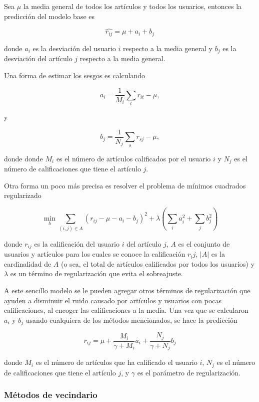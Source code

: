 Sea $\mu$ la media general de todos los artículos y todos los usuarios, entonces la predicción del modelo base es

\[
\hat{r_{ij}} = \mu + a_i + b_j
\]

donde $a_i$ es la desviación del usuario $i$ respecto a la media general y $b_j$ es la desviación del artículo $j$ respecto a la media general.

Una forma de estimar los sesgos es calculando

\[
a_i = \frac{1}{M_i} \sum_t r_{it} - \mu,
\]

y 

\[
b_j = \frac{1}{N_j} \sum_s r_{sj} - \mu,
\]

donde donde $M_i$ es el número de artículos calificados por el usuario $i$ y $N_j$ es el número de calificaciones que tiene el artículo $j$.

Otra forma un poco más precisa es resolver el problema de mínimos cuadrados regularizado

\[
\min_{b} \sum_{(i, j) \in A} \left( r_{ij} - \mu - a_i - b_j \right) ^2 + \lambda \left( \sum_{i} a_i^2 + \sum_{j} b_j^2 \right)
\]

donde $r_{ij}$ es la calificación del usuario $i$ del artículo $j$, $A$ es el conjunto de usuarios y artículos para los cuales se conoce la calificación $r_ij$, $ \vert A \vert$ es la cardinalidad de $A$ (o sea, el total de artículos calificados por todos los usuarios) y $\lambda$ es un término de regularización que evita el sobreajuste.

A este sencillo modelo se le pueden agregar otros términos de regularización que ayuden a disminuir el ruido causado por artículos y usuarios con pocas calificaciones, al encoger las calificaciones a la media. Una vez que se calcularon $a_i$ y $b_j$ usando cualquiera de los métodos mencionados, se hace la predicción

\begin{equation}
  \label{ec:modelo_base}
  r_{ij} = \mu + \frac{M_i}{\gamma + M_i} a_i + \frac{N_j}{\gamma + N_j}b_j
\end{equation}

donde $M_i$ es el número de artículos que ha calificado el usuario $i$, $N_j$ es el número de calificaciones que tiene el artículo $j$, y $\gamma$ es el parámetro de regularización.

\subsubsection{Métodos de vecindario}

